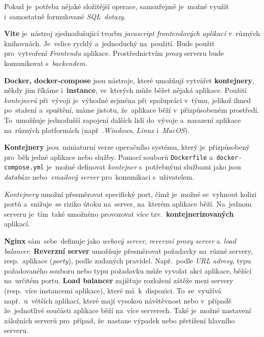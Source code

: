 \documentclass[11pt,a4paper]{report}
\begin{document}
            Pokud je~potřeba nějaké složitější operace, samozřejmě je~možné využít i~samostatně formulované \emph{SQL~dotazy}. \cite{gormGORM, freecodecamp:orm}

            \textbf{Vite} je~nástroj zjednodušující tvorbu \emph{javascript frontendových aplikací} v~různých knihovnách. Je~velice rychlý a~jednoduchý na~použití. Bude použit pro~vytvoření \emph{Frontendu} aplikace. Prostřednictvím \emph{proxy} serveru bude komunikovat s~\emph{backendem}.

            \textbf{Docker, docker-compose} jsou nástroje, které umožňují vytvářet \textbf{kontejnery}, někdy jim říkáme i~\textbf{instance}, ve~kterých může běžet nějaká aplikace. Použití \emph{kontejnerů} při~vývoji je~výhodné zejména při~spolupráci v~týmu, jelikož ihned po~stažení a~spuštění, máme jistotu, že~aplikace běží v~přizpůsobeném prostředí. To~umožňuje jednodušší zapojení dalších lidí do~vývoje a~nasazení aplikace na~různých platformách (např~.\emph{Windows}, \emph{Linux} i~\emph{MacOS}).

            \textbf{Kontejnery} jsou~miniaturní verze operačního systému, který je~přizpůsobený pro~běh jedné aplikace nebo služby. Pomocí souborů \texttt{Dockerfile} a~\texttt{docker-compose.yml} je~možné definovat \emph{kontejner} s~potřebnými službami jako jsou \emph{databáze} nebo~\emph{emailový server} pro~komunikaci s~uživatelem.

            \emph{Kontejnery} umožní přesměrovat specifický port, čímž je~možné se~vyhnout kolizi portů a~snižuje~se riziko útoku na~server, na~kterém aplikace běží. Na~jednom serveru je~tím~také umožněno provozovat více tzv.~\textbf{kontejnerizovaných} aplikací. \cite{docker, dockernginxperformance}

            \textbf{Nginx} sám~sebe~definuje jako \emph{webový server}, \emph{reverzní proxy server} a~\emph{load balancer}. \textbf{Reverzní server} umožňuje přesměrovat požadavky na~různé servery, resp.~aplikace (\emph{porty}), podle zadaných pravidel. Např.~podle \emph{URL adresy}, typu požadovaného souboru nebo typu požadavku může vyvolat akci aplikace, běžící na~určitém portu. \textbf{Load balancer} zajišťuje rozložení zátěže mezi servery (resp.~více instancemi aplikace), které má~k~dispozici. To~se~využívá např.~u~větších aplikací, které mají vysokou návštěvnost nebo v~případě že~jednotlivé součásti aplikace běží na~více serverech. Také je~možné nastavení záložních serverů pro~případ, že~nastane výpadek nebo přetížení hlavního serveru.
            
\end{document}

